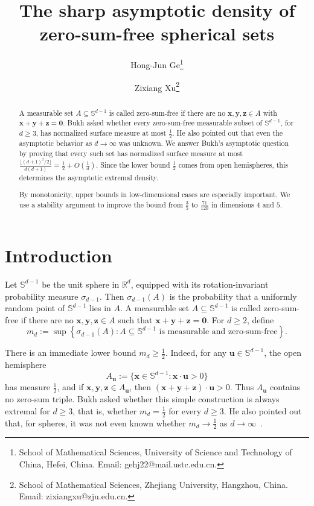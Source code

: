 \documentclass[11pt]{article}
\title{The sharp asymptotic density of zero-sum-free spherical sets}
\author{
Hong-Jun Ge\thanks{School of Mathematical Sciences, University of Science and Technology of China,
Hefei, China. Email: gehj22@mail.ustc.edu.cn.}
\and 
Zixiang Xu\thanks{School of Mathematical Sciences, Zhejiang University, Hangzhou, China. Email: zixiangxu@zju.edu.cn.}
}
\date{}
\theoremstyle{definition}
\begin{document}
\maketitle
\begin{abstract}
A measurable set \(A\subseteq \mathbb S^{d-1}\) is called zero-sum-free if
there are no \(\boldsymbol{x},\boldsymbol{y},\boldsymbol{z}\in A\) with
\(\boldsymbol{x}+\boldsymbol{y}+\boldsymbol{z}=\boldsymbol{0}\). Bukh asked
whether every zero-sum-free measurable subset of \(\mathbb S^{d-1}\), for
\(d\ge3\), has normalized surface measure at most \(\frac{1}{2}\). He also
pointed out that even the asymptotic behavior as \(d\to\infty\) was
unknown. We answer Bukh's
asymptotic question by proving that every such set has normalized surface
measure at most
\(
    \frac{\lfloor (d+1)^2/2\rfloor}{d(d+1)}
    =
    \frac{1}{2}+O\left(\frac{1}{d}\right).
\)
Since the lower bound \(\frac{1}{2}\) comes from open hemispheres, this
determines the asymptotic extremal density.

By monotonicity, upper bounds in low-dimensional cases are especially important.
We use a stability argument to improve the bound from
\(\frac{3}{5}\) to \(\frac{71}{120}\) in dimensions \(4\) and \(5\). 
\end{abstract}
\section{Introduction}
Let \(\mathbb S^{d-1}\) be the unit sphere in \(\mathbb R^d\), equipped
with its rotation-invariant probability measure \(\sigma_{d-1}\). Then
\(\sigma_{d-1}(A)\) is the probability that a uniformly random point of
\(\mathbb S^{d-1}\) lies in \(A\).  A measurable set
\(A\subseteq\mathbb S^{d-1}\) is called zero-sum-free if there are no
\(\boldsymbol{x},\boldsymbol{y},\boldsymbol{z}\in A\) such that
\(  \boldsymbol{x}+\boldsymbol{y}+\boldsymbol{z}=\boldsymbol{0}.
\)
For \(d\ge2\), define
\[
    m_d:=
    \sup\left\{\sigma_{d-1}(A):
    A\subseteq\mathbb S^{d-1}\text{ is measurable and zero-sum-free}
    \right\}.
\]

There is an immediate lower bound \(m_d\ge\frac{1}{2}\).  Indeed, for any
\(\boldsymbol{u}\in\mathbb S^{d-1}\), the open hemisphere
\[
    A_{\boldsymbol{u}}
    :=
    \{\boldsymbol{x}\in\mathbb S^{d-1}:
    \boldsymbol{x}\cdot\boldsymbol{u}>0\}
\]
has measure \(\frac{1}{2}\), and if
\(\boldsymbol{x},\boldsymbol{y},\boldsymbol{z}\in A_{\boldsymbol{u}}\),
then
\(  (\boldsymbol{x}+\boldsymbol{y}+\boldsymbol{z})\cdot\boldsymbol{u}>0.
\)
Thus \(A_{\boldsymbol{u}}\) contains no zero-sum triple. Bukh asked whether this simple construction is always extremal for
\(d\ge3\), that is, whether \(m_d=\frac{1}{2}\) for every \(d\ge3\).  He
also pointed out that, for spheres, it was not even known whether
\(m_d\to\frac{1}{2}\) as \(d\to\infty\)~\cite{BukhProblems}.
\end{document}
